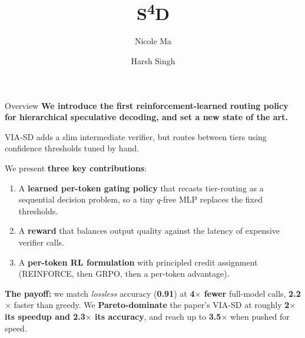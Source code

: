 \documentclass[aspectratio=169,11pt]{beamer}
\title{\textbf{S\textsuperscript{4}D}}
\author{Nicole Ma \and Harsh Singh}
\date{}
\begin{document}
\begin{frame}\titlepage\end{frame}

\begin{frame}{Overview}
\textbf{We introduce the first reinforcement-learned routing policy for hierarchical speculative decoding, and set a new state of the art.}
\vspace{6pt}

{\footnotesize VIA-SD adds a slim intermediate verifier, but routes between tiers using confidence thresholds tuned by hand.}
\vspace{4pt}

We present \textbf{three key contributions}:
\begin{enumerate}
  \item A \textbf{learned per-token gating policy} that recasts tier-routing as a sequential decision problem, so a tiny $q$-free MLP replaces the fixed thresholds.
  \item A \textbf{reward} that balances output quality against the latency of expensive verifier calls.
  \item A \textbf{per-token RL formulation} with principled credit assignment (REINFORCE, then GRPO, then a per-token advantage).
\end{enumerate}
\vspace{2pt}
{\footnotesize\textbf{The payoff:} we match \emph{lossless} accuracy (\textbf{0.91}) at \textbf{4$\times$ fewer} full-model calls,
\textbf{2.2$\times$} faster than greedy. We \textbf{Pareto-dominate} the paper's VIA-SD at roughly \textbf{2$\times$ its speedup and 2.3$\times$ its accuracy},
and reach up to \textbf{3.5$\times$} when pushed for speed.}
\end{frame}
\end{document}
